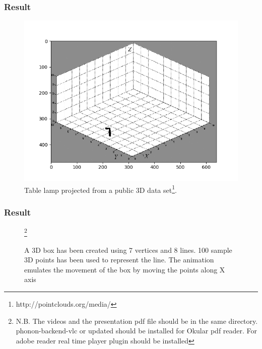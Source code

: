 \documentclass[11pt]{beamer}
\begin{document}
\begin{frame}
\frametitle{Result}
\begin{figure}
\centering
\includegraphics[height=.6\textheight]{tablelamp.png}\vfill
\caption{Table lamp projected from a public 3D data set\footnote{http://pointclouds.org/media/}.}
\end{figure}
\end{frame}

\begin{frame}
\frametitle{Result}
\begin{figure}
\centering
{}
\caption{A 3D box has been created using 7 vertices and 8 lines. 100 sample 3D points has been used to represent the line. The animation emulates the movement of the box by moving the points along X axis}
\footnote{N.B. The videos and the presentation pdf file should be in the same directory. phonon-backend-vlc or updated should be installed for Okular pdf reader. For adobe reader real time player plugin should be installed}
\end{figure}
\end{frame}
\end{document}
